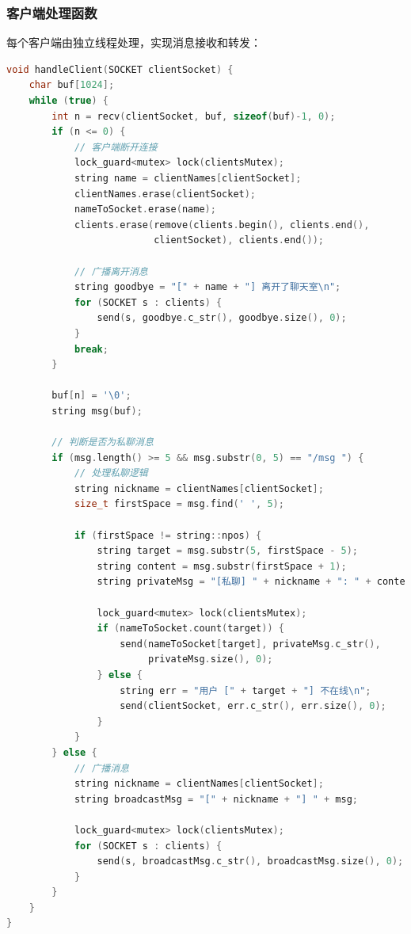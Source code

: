 \documentclass[12pt, a4paper]{article}
\begin{document}
\subsubsection{客户端处理函数}

每个客户端由独立线程处理，实现消息接收和转发：

\begin{lstlisting}[language=c++]
void handleClient(SOCKET clientSocket) {
    char buf[1024];
    while (true) {
        int n = recv(clientSocket, buf, sizeof(buf)-1, 0);
        if (n <= 0) {
            // 客户端断开连接
            lock_guard<mutex> lock(clientsMutex);
            string name = clientNames[clientSocket];
            clientNames.erase(clientSocket);
            nameToSocket.erase(name);
            clients.erase(remove(clients.begin(), clients.end(), 
                          clientSocket), clients.end());
            
            // 广播离开消息
            string goodbye = "[" + name + "] 离开了聊天室\n";
            for (SOCKET s : clients) {
                send(s, goodbye.c_str(), goodbye.size(), 0);
            }
            break;
        }
        
        buf[n] = '\0';
        string msg(buf);
        
        // 判断是否为私聊消息
        if (msg.length() >= 5 && msg.substr(0, 5) == "/msg ") {
            // 处理私聊逻辑
            string nickname = clientNames[clientSocket];
            size_t firstSpace = msg.find(' ', 5);
            
            if (firstSpace != string::npos) {
                string target = msg.substr(5, firstSpace - 5);
                string content = msg.substr(firstSpace + 1);
                string privateMsg = "[私聊] " + nickname + ": " + content;
                
                lock_guard<mutex> lock(clientsMutex);
                if (nameToSocket.count(target)) {
                    send(nameToSocket[target], privateMsg.c_str(), 
                         privateMsg.size(), 0);
                } else {
                    string err = "用户 [" + target + "] 不在线\n";
                    send(clientSocket, err.c_str(), err.size(), 0);
                }
            }
        } else {
            // 广播消息
            string nickname = clientNames[clientSocket];
            string broadcastMsg = "[" + nickname + "] " + msg;
            
            lock_guard<mutex> lock(clientsMutex);
            for (SOCKET s : clients) {
                send(s, broadcastMsg.c_str(), broadcastMsg.size(), 0);
            }
        }
    }
}
\end{lstlisting}
\end{document}
